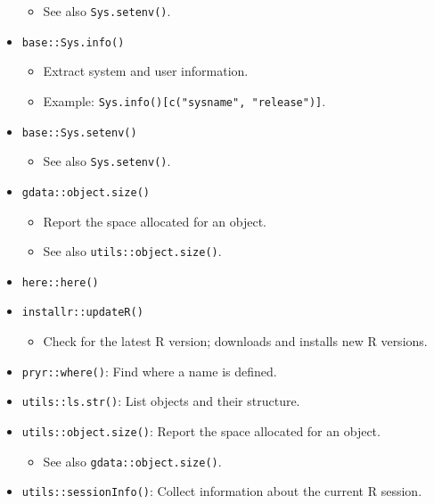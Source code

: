 \documentclass[
]{book}
\providecommand{\tightlist}{%
  \setlength{\itemsep}{0pt}\setlength{\parskip}{0pt}}
\begin{document}
\begin{itemize}
  \begin{itemize}
  \tightlist
  \item
    See also \texttt{Sys.setenv()}.
  \end{itemize}
\item
  \texttt{base::Sys.info()}

  \begin{itemize}
  \tightlist
  \item
    Extract system and user information.
  \item
    Example: \texttt{Sys.info(){[}c("sysname",\ "release"){]}}.
  \end{itemize}
\item
  \texttt{base::Sys.setenv()}

  \begin{itemize}
  \tightlist
  \item
    See also \texttt{Sys.setenv()}.
  \end{itemize}
\item
  \texttt{gdata::object.size()}

  \begin{itemize}
  \tightlist
  \item
    Report the space allocated for an object.
  \item
    See also \texttt{utils::object.size()}.
  \end{itemize}
\item
  \texttt{here::here()}
\item
  \texttt{installr::updateR()}

  \begin{itemize}
  \tightlist
  \item
    Check for the latest R version; downloads and installs new R versions.
  \end{itemize}
\item
  \texttt{pryr::where()}: Find where a name is defined.
\item
  \texttt{utils::ls.str()}: List objects and their structure.
\item
  \texttt{utils::object.size()}: Report the space allocated for an object.

  \begin{itemize}
  \tightlist
  \item
    See also \texttt{gdata::object.size()}.
  \end{itemize}
\item
  \texttt{utils::sessionInfo()}: Collect information about the current R session.
\end{itemize}
\end{document}
